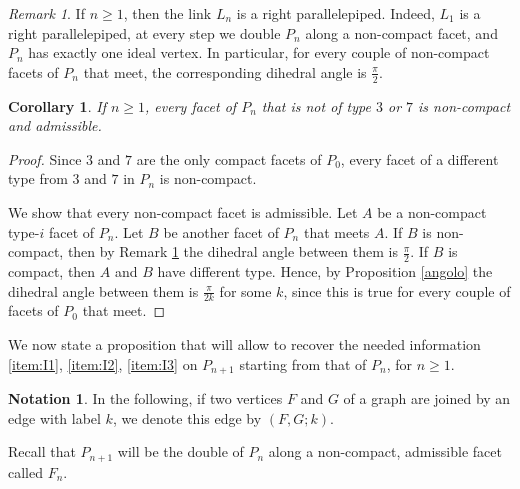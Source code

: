 \documentclass{amsart}
\newtheorem{cor}[lemma]{Corollary}
\theoremstyle{definition}
\newtheorem{notat}[lemma]{Notation}
\theoremstyle{remark}
\newtheorem{rem}[lemma]{Remark}
\newcommand{\lk}{L}
\begin{document}
\begin{rem}
\label{cubo}
    If $n\ge 1$, then the link $L_n$ is a right parallelepiped. Indeed, $\lk_1$ is a right parallelepiped, at every step we double $P_n$ along a non-compact facet, and $P_n$ has exactly one ideal vertex. In particular, for every couple of non-compact facets of $P_n$ that meet, the corresponding dihedral angle is $\frac{\pi}{2}$.
\end{rem}

\begin{cor}
\label{suit}
    If $n\ge 1$, every facet of $P_n$ that is not of type $3$ or $7$ is non-compact and admissible.
\end{cor}
\begin{proof}
    Since $3$ and $7$ are the only compact facets of $P_0$, every facet of a different type from $3$ and $7$ in $P_n$ is non-compact.
    
    We show that every non-compact facet is admissible. Let $A$ be a non-compact type-$i$ facet of $P_n$. Let $B$ be another facet of $P_n$ that meets $A$. If $B$ is non-compact, then by Remark \ref{cubo} the dihedral angle between them is $\frac{\pi}{2}$. If $B$ is compact, then $A$ and $B$ have different type. Hence, by Proposition \ref{angolo} the dihedral angle between them is $\frac{\pi}{2k}$ for some $k$, since this is true for every couple of facets of $P_0$ that meet.
\end{proof}

We now state a proposition that will allow to recover the needed information \ref{item:I1},  \ref{item:I2}, \ref{item:I3} on $P_{n+1}$ starting from that of $P_n$, for $n\ge 1$.

\begin{notat}
    In the following, if two vertices $F$ and $G$ of a graph are joined by an edge with label $k$, we denote this edge by $(F, G; k)$.
\end{notat}

Recall that $P_{n+1}$  will be the double of $P_n$ along a non-compact, admissible facet called $F_n$.
\end{document}
